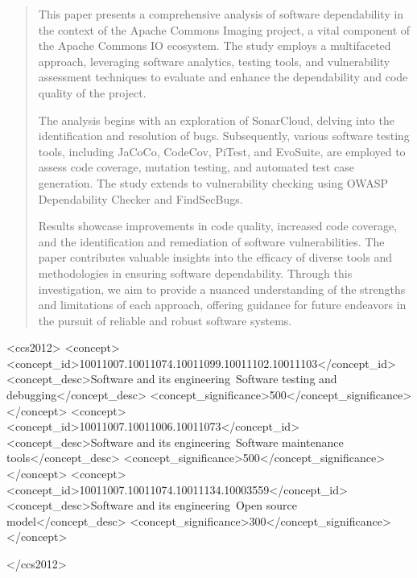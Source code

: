 \documentclass[sigconf]{acmart}
\begin{document}
\begin{abstract}
  This paper presents a comprehensive analysis of software dependability in the context of the Apache Commons Imaging project, a vital component of the Apache Commons IO ecosystem. The study employs a multifaceted approach, leveraging software analytics, testing tools, and vulnerability assessment techniques to evaluate and enhance the dependability and code quality of the project.

  The analysis begins with an exploration of SonarCloud, delving into the identification and resolution of bugs. Subsequently, various software testing tools, including JaCoCo, CodeCov, PiTest, and EvoSuite, are employed to assess code coverage, mutation testing, and automated test case generation. The study extends to vulnerability checking using OWASP Dependability Checker and FindSecBugs.
  
  Results showcase improvements in code quality, increased code coverage, and the identification and remediation of software vulnerabilities. The paper contributes valuable insights into the efficacy of diverse tools and methodologies in ensuring software dependability. Through this investigation, we aim to provide a nuanced understanding of the strengths and limitations of each approach, offering guidance for future endeavors in the pursuit of reliable and robust software systems.
\end{abstract}

\begin{CCSXML}
<ccs2012>
   <concept>
       <concept_id>10011007.10011074.10011099.10011102.10011103</concept_id>
       <concept_desc>Software and its engineering~Software testing and debugging</concept_desc>
       <concept_significance>500</concept_significance>
    </concept>
    <concept>
       <concept_id>10011007.10011006.10011073</concept_id>
       <concept_desc>Software and its engineering~Software maintenance tools</concept_desc>
       <concept_significance>500</concept_significance>
   </concept>
   <concept>
       <concept_id>10011007.10011074.10011134.10003559</concept_id>
       <concept_desc>Software and its engineering~Open source model</concept_desc>
       <concept_significance>300</concept_significance>
   </concept>

 </ccs2012>
\end{CCSXML}
\end{document}
